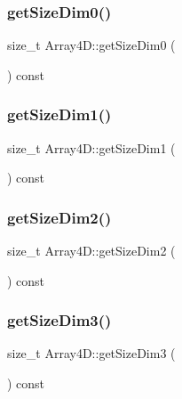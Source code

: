 \subsubsection{\texorpdfstring{get\+Size\+Dim0()}{getSizeDim0()}}
{\footnotesize\ttfamily size\+\_\+t Array4\+D\+::get\+Size\+Dim0 (\begin{DoxyParamCaption}{ }\end{DoxyParamCaption}) const}

\mbox{\label{class_array4_d_a32f89196e8a5384f8a207812376f716d}} 
\subsubsection{\texorpdfstring{get\+Size\+Dim1()}{getSizeDim1()}}
{\footnotesize\ttfamily size\+\_\+t Array4\+D\+::get\+Size\+Dim1 (\begin{DoxyParamCaption}{ }\end{DoxyParamCaption}) const}

\mbox{\label{class_array4_d_abc321f73fd2665ac1c58afaf3ebe60e6}} 
\subsubsection{\texorpdfstring{get\+Size\+Dim2()}{getSizeDim2()}}
{\footnotesize\ttfamily size\+\_\+t Array4\+D\+::get\+Size\+Dim2 (\begin{DoxyParamCaption}{ }\end{DoxyParamCaption}) const}

\mbox{\label{class_array4_d_af767db0beba39cd815b903a8076d2695}} 
\subsubsection{\texorpdfstring{get\+Size\+Dim3()}{getSizeDim3()}}
{\footnotesize\ttfamily size\+\_\+t Array4\+D\+::get\+Size\+Dim3 (\begin{DoxyParamCaption}{ }\end{DoxyParamCaption}) const}

